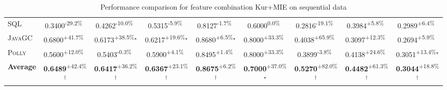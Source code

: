 \begin{table}[htbp]
\begin{tabular}{l|cccc|cccc}
\textsc{SQL} & \cellcolor{red!30}0.3400\textsuperscript{-29.2\%}$^{\,\,\,}$ & \cellcolor{red!30}0.4262\textsuperscript{-10.0\%}$^{\,\,\,}$ & \cellcolor{red!30}0.5315\textsuperscript{-5.9\%}$^{\,\,\,}$ & \cellcolor{red!30}0.8127\textsuperscript{-1.7\%}$^{\,\,\,}$ & \cellcolor{red!30}0.6000\textsuperscript{0.0\%}$^{\,\,\,}$ & \cellcolor{red!30}0.2816\textsuperscript{-19.1\%}$^{\,\,\,}$ & \cellcolor{green!30}0.3984\textsuperscript{+5.8\%}$^{\,\,\,}$ & \cellcolor{green!30}0.2989\textsuperscript{+6.4\%}$^{\,\,\,}$ \\
\textsc{JavaGC} & \cellcolor{green!30}0.6800\textsuperscript{+41.7\%}$^{\,\,\,}$ & \cellcolor{green!30}0.6173\textsuperscript{+38.5\%}$^\star$ & \cellcolor{green!30}0.6217\textsuperscript{+19.6\%}$^\star$ & \cellcolor{green!30}0.8680\textsuperscript{+6.5\%}$^\star$ & \cellcolor{green!30}0.8000\textsuperscript{+33.3\%}$^{\,\,\,}$ & \cellcolor{green!30}0.4038\textsuperscript{+65.9\%}$^{\,\,\,}$ & \cellcolor{green!30}0.3097\textsuperscript{+12.3\%}$^{\,\,\,}$ & \cellcolor{green!30}0.2694\textsuperscript{+5.9\%}$^{\,\,\,}$ \\
\textsc{Polly} & \cellcolor{green!30}0.5600\textsuperscript{+12.0\%}$^{\,\,\,}$ & \cellcolor{red!30}0.5403\textsuperscript{-0.3\%}$^{\,\,\,}$ & \cellcolor{green!30}0.5900\textsuperscript{+4.1\%}$^{\,\,\,}$ & \cellcolor{green!30}0.8495\textsuperscript{+1.4\%}$^{\,\,\,}$ & \cellcolor{green!30}0.8000\textsuperscript{+33.3\%}$^{\,\,\,}$ & \cellcolor{red!30}0.3899\textsuperscript{-3.8\%}$^{\,\,\,}$ & \cellcolor{green!30}0.4138\textsuperscript{+24.6\%}$^{\,\,\,}$ & \cellcolor{green!30}0.3051\textsuperscript{+13.4\%}$^\star$ \\
\hline
\textbf{Average} & \cellcolor{green!30}\textbf{0.6489}\textsuperscript{+42.4\%}$^\dagger$ & \cellcolor{green!30}\textbf{0.6417}\textsuperscript{+36.2\%}$^\dagger$ & \cellcolor{green!30}\textbf{0.6367}\textsuperscript{+23.1\%}$^\dagger$ & \cellcolor{green!30}\textbf{0.8675}\textsuperscript{+6.2\%}$^\dagger$ & \cellcolor{green!30}\textbf{0.7000}\textsuperscript{+37.0\%}$^\star$ & \cellcolor{green!30}\textbf{0.5270}\textsuperscript{+82.0\%}$^\dagger$ & \cellcolor{green!30}\textbf{0.4482}\textsuperscript{+61.3\%}$^\dagger$ & \cellcolor{green!30}\textbf{0.3044}\textsuperscript{+18.8\%}$^\dagger$ \\
\hline
\end{tabular}
\caption{Performance comparison for feature combination Kur+MIE on sequential data}
\label{tab:combo_Kur_MIE_performance_sequential}
\end{table}